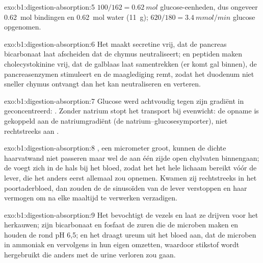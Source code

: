\begin{solution}{exo:b1:digestion-absorption:5}
$100/162 = \qty{0.62}{mol}$ glucose-eenheden, dus ongeveer
\qty{0.62}{mol} bindingen en \qty{0.62}{mol} water (\qty{11}{g});
$620/180 = \qty{3.4}{mmol/min}$ glucose opgenomen.
\end{solution}

\begin{solution}{exo:b1:digestion-absorption:6}
Het  maakt secretine vrij, dat de pancreas bicarbonaat laat afscheiden
dat de chymus neutraliseert;  en peptiden maken cholecystokinine vrij,
dat de galblaas laat samentrekken (er komt gal binnen), de pancreasenzymen
stimuleert en de maaglediging remt, zodat het duodenum niet sneller chymus
ontvangt dan het kan neutraliseren en verteren.
\end{solution}

\begin{solution}{exo:b1:digestion-absorption:7}
Glucose werd achtvoudig tegen zijn gradiënt in geconcentreerd: . Zonder natrium stopt het transport bij evenwicht: de opname is
gekoppeld aan de natriumgradiënt (de natrium--glucosesymporter), niet
rechtstreeks aan .
\end{solution}

\begin{solution}{exo:b1:digestion-absorption:8}
, een micrometer groot, kunnen de dichte haarvatwand niet
passeren maar wel de aan één zijde open chylvaten binnengaan; de 
voegt zich in de hals bij het bloed, zodat het  het hele lichaam bereikt
vóór de lever, die het anders eerst allemaal zou opnemen. Kwamen zij
rechtstreeks in het poortaderbloed, dan zouden de  de sinusoïden
van de lever verstoppen en haar vermogen om na elke maaltijd  te
verwerken verzadigen.
\end{solution}

\begin{solution}{exo:b1:digestion-absorption:9}
Het bevochtigt de vezels en laat ze drijven voor het herkauwen; zijn
bicarbonaat en fosfaat  de zuren die de microben maken en houden
de  rond pH 6,5; en het draagt ureum uit het bloed aan, dat de microben
in ammoniak en vervolgens in hun eigen  omzetten, waardoor stikstof
wordt hergebruikt die anders met de urine verloren zou gaan.
\end{solution}

